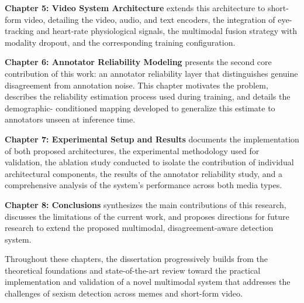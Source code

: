\textbf{Chapter 5: Video System Architecture} extends this architecture to short-form
video, detailing the video, audio, and text encoders, the integration of eye-tracking
and heart-rate physiological signals, the multimodal fusion strategy with modality
dropout, and the corresponding training configuration.

\textbf{Chapter 6: Annotator Reliability Modeling} presents the second core
contribution of this work: an annotator reliability layer that distinguishes genuine
disagreement from annotation noise. This chapter motivates the problem, describes the
reliability estimation process used during training, and details the demographic-
conditioned mapping developed to generalize this estimate to annotators unseen at
inference time.

\textbf{Chapter 7: Experimental Setup and Results} documents the implementation
of both proposed architectures, the experimental methodology used for validation,
the ablation study conducted to isolate the contribution of individual architectural
components, the results of the annotator reliability study, and a comprehensive analysis
of the system's performance across both media types.

\textbf{Chapter 8: Conclusions} synthesizes the main contributions of this research,
discusses the limitations of the current work, and proposes directions for future
research to extend the proposed multimodal, disagreement-aware detection system.

Throughout these chapters, the dissertation progressively builds from the theoretical
foundations and state-of-the-art review toward the practical implementation and
validation of a novel multimodal system that addresses the challenges of sexism
detection across memes and short-form video.
